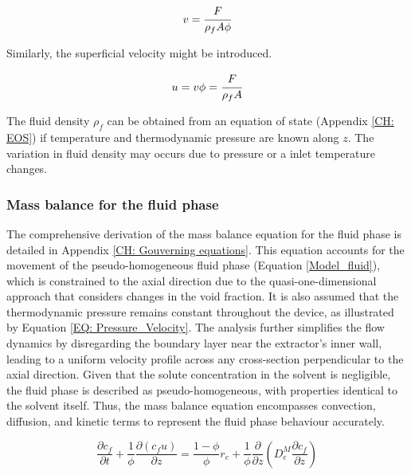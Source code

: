 \documentclass[../Article_Model_Parameters.tex]{subfiles}
\begin{document}
	{\footnotesize
	\begin{equation}
		v = \cfrac{F}{\rho_f A\phi} 
	\end{equation}
	}
	
	Similarly, the superficial velocity might be introduced.
	
	{\footnotesize
		\begin{equation}
			u = v \phi = \cfrac{F}{\rho_f A }
		\end{equation}
	}
	
	The fluid density $\rho_f$ can be obtained from an equation of state (Appendix \ref{CH: EOS}) if temperature and thermodynamic pressure are known along $z$. The variation in fluid density may occurs due to pressure or a inlet temperature changes. 
		
	\subsubsection{Mass balance for the fluid phase} \label{CH: Mass_balance_fluid}
	
	The comprehensive derivation of the mass balance equation for the fluid phase is detailed in Appendix \ref{CH: Gouverning equations}. This equation accounts for the movement of the pseudo-homogeneous fluid phase (Equation \ref{Model_fluid}), which is constrained to the axial direction due to the quasi-one-dimensional approach that considers changes in the void fraction. It is also assumed that the thermodynamic pressure remains constant throughout the device, as illustrated by Equation \ref{EQ: Pressure_Velocity}. The analysis further simplifies the flow dynamics by disregarding the boundary layer near the extractor's inner wall, leading to a uniform velocity profile across any cross-section perpendicular to the axial direction. Given that the solute concentration in the solvent is negligible, the fluid phase is described as pseudo-homogeneous, with properties identical to the solvent itself. Thus, the mass balance equation encompasses convection, diffusion, and kinetic terms to represent the fluid phase behaviour accurately.
	
	{\footnotesize
		\begin{equation}
			\label{Model_fluid}
			\frac{\partial c_f}{\partial t}
			+ \frac{1}{\phi} \frac{\partial \left( c_f u\right)}{\partial z}
			= \frac{1-\phi}{\phi} r_e
			+ \frac{1}{\phi} \frac{\partial}{\partial z} \left( D^M_e \frac{\partial c_f}{\partial z} \right)
		\end{equation}
	}
	
\end{document}
